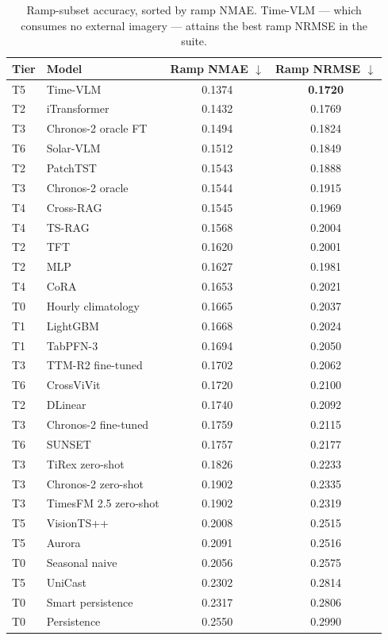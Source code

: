 \begin{table}[h!]
\centering
\small
\begin{tabular}{l l c c}
\hline
\textbf{Tier} & \textbf{Model} & \textbf{Ramp NMAE} $\downarrow$ &
\textbf{Ramp NRMSE} $\downarrow$ \\
\hline
T5 & Time-VLM & 0.1374 & \textbf{0.1720} \\
T2 & iTransformer & 0.1432 & 0.1769 \\
T3 & Chronos-2 oracle FT & 0.1494 & 0.1824 \\
T6 & Solar-VLM & 0.1512 & 0.1849 \\
T2 & PatchTST & 0.1543 & 0.1888 \\
T3 & Chronos-2 oracle & 0.1544 & 0.1915 \\
T4 & Cross-RAG & 0.1545 & 0.1969 \\
T4 & TS-RAG & 0.1568 & 0.2004 \\
T2 & TFT & 0.1620 & 0.2001 \\
T2 & MLP & 0.1627 & 0.1981 \\
T4 & CoRA & 0.1653 & 0.2021 \\
T0 & Hourly climatology & 0.1665 & 0.2037 \\
T1 & LightGBM & 0.1668 & 0.2024 \\
T1 & TabPFN-3 & 0.1694 & 0.2050 \\
T3 & TTM-R2 fine-tuned & 0.1702 & 0.2062 \\
T6 & CrossViVit & 0.1720 & 0.2100 \\
T2 & DLinear & 0.1740 & 0.2092 \\
T3 & Chronos-2 fine-tuned & 0.1759 & 0.2115 \\
T6 & SUNSET & 0.1757 & 0.2177 \\
T3 & TiRex zero-shot & 0.1826 & 0.2233 \\
T3 & Chronos-2 zero-shot & 0.1902 & 0.2335 \\
T3 & TimesFM 2.5 zero-shot & 0.1902 & 0.2319 \\
T5 & VisionTS++ & 0.2008 & 0.2515 \\
T5 & Aurora & 0.2091 & 0.2516 \\
T0 & Seasonal naive & 0.2056 & 0.2575 \\
T5 & UniCast & 0.2302 & 0.2814 \\
T0 & Smart persistence & 0.2317 & 0.2806 \\
T0 & Persistence & 0.2550 & 0.2990 \\
\hline
\end{tabular}
\caption{Ramp-subset accuracy, sorted by ramp NMAE. Time-VLM --- which consumes no external
imagery --- attains the best ramp NRMSE in the suite.}
\label{tab:ramp}
\end{table}


